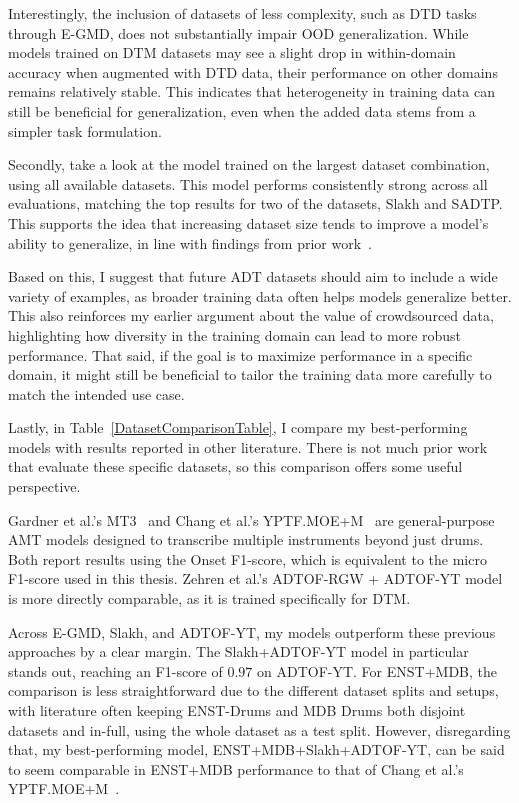Interestingly, the inclusion of datasets of less complexity, such as \gls{DTD} tasks through E-GMD, does not substantially impair \gls{OOD} generalization. While models trained on \gls{DTM} datasets may see a slight drop in within-domain accuracy when augmented with \gls{DTD} data, their performance on other domains remains relatively stable. This indicates that heterogeneity in training data can still be beneficial for generalization, even when the added data stems from a simpler task formulation.

Secondly, take a look at the model trained on the largest dataset combination, using all available datasets. This model performs consistently strong across all evaluations, matching the top results for two of the datasets, Slakh and SADTP. This supports the idea that increasing dataset size tends to improve a model's ability to generalize, in line with findings from prior work~\cite{signals4040042}. 

Based on this, I suggest that future \gls{ADT} datasets should aim to include a wide variety of examples, as broader training data often helps models generalize better. This also reinforces my earlier argument about the value of crowdsourced data, highlighting how diversity in the training domain can lead to more robust performance. That said, if the goal is to maximize performance in a specific domain, it might still be beneficial to tailor the training data more carefully to match the intended use case.

Lastly, in Table~\ref{DatasetComparisonTable}, I compare my best-performing models with results reported in other literature. There is not much prior work that evaluate these specific datasets, so this comparison offers some useful perspective.

Gardner et al.'s MT3~\cite{gardner2022mt3multitaskmultitrackmusic} and Chang et al.'s YPTF.MOE+M~\cite{chang2024yourmt3+} are general-purpose \gls{AMT} models designed to transcribe multiple instruments beyond just drums. Both report results using the Onset F1-score, which  is equivalent to the micro F1-score used in this thesis. Zehren et al.'s ADTOF-RGW + ADTOF-YT model~\cite{signals4040042} is more directly comparable, as it is trained specifically for \gls{DTM}.

Across E-GMD, Slakh, and ADTOF-YT, my models outperform these previous approaches by a clear margin. The Slakh+ADTOF-YT model in particular stands out, reaching an F1-score of $0.97$ on ADTOF-YT. For ENST+MDB, the comparison is less straightforward due to the different dataset splits and setups, with literature often keeping ENST-Drums and MDB Drums both disjoint datasets and in-full, using the whole dataset as a test split. However, disregarding that, my best-performing model, ENST+MDB+Slakh+ADTOF-YT, can be said to seem comparable in ENST+MDB performance to that of Chang et al.'s YPTF.MOE+M~\cite{chang2024yourmt3+}. 

